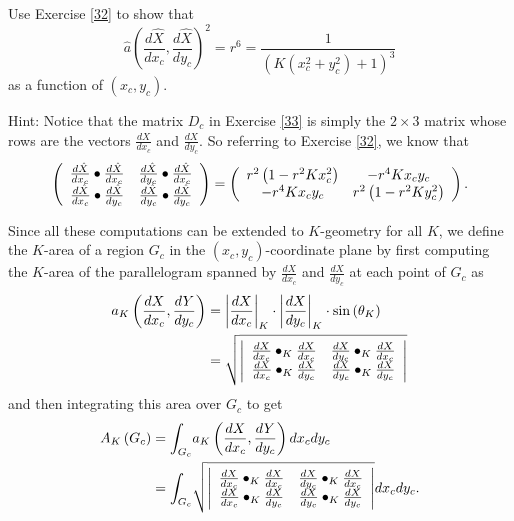 \documentclass{ximera}
\begin{document}
\begin{exercise}
\label{79}Use Exercise \ref{32} to show that%
\[
\hat{a}\left(  \frac{d\hat{X}}{dx_{c}},\frac{d\hat{X}}{dy_{c}}\right)
^{2}=r^{6}=\frac{1}{\left(  K\left(  x_{c}^{2}+y_{c}^{2}\right)  +1\right)
^{3}}%
\]
as a function of $\left(  x_{c},y_{c}\right)  $.

Hint: Notice that the matrix $D_{c}$ in Exercise \ref{33} is simply the
$2\times3$ matrix whose rows are the vectors $\frac{dX}{dx_{c}}$ and $\frac
{dX}{dy_{c}}$. So referring to Exercise \ref{32}, we know that%
\[
\left(
\begin{array}
[c]{cc}%
\frac{d\hat{X}}{dx_{c}}\bullet\frac{d\hat{X}}{dx_{c}} & \frac{d\hat{X}}%
{dy_{c}}\bullet\frac{d\hat{X}}{dx_{c}}\\
\frac{d\hat{X}}{dx_{c}}\bullet\frac{d\hat{X}}{dy_{c}} & \frac{d\hat{X}}%
{dy_{c}}\bullet\frac{d\hat{X}}{dy_{c}}%
\end{array}
\right)  =\left(
\begin{array}
[c]{cc}%
r^{2}\left(  1-r^{2}Kx_{c}^{2}\right)  & -r^{4}Kx_{c}y_{c}\\
-r^{4}Kx_{c}y_{c} & r^{2}\left(  1-r^{2}Ky_{c}^{2}\right)
\end{array}
\right)  .
\]

\end{exercise}

Since all these computations can be extended to $K$-geometry for all $K$, we
define the $K$-area of a region $G_{c}$ in the $\left(  x_{c},y_{c}\right)
$-coordinate plane by first computing the $K$-area of the parallelogram
spanned by $\frac{dX}{dx_{c}}$ and $\frac{dX}{dy_{c}}$ at each point of
$G_{c}$ as%
\begin{align*}
a_{K}\left(  \frac{dX}{dx_{c}},\frac{dY}{dy_{c}}\right)   &  =\left\vert
\frac{dX}{dx_{c}}\right\vert _{K}\cdot\left\vert \frac{dX}{dy_{c}}\right\vert
_{K}\cdot\mathrm{sin}\left(  \theta_{K}\right) \\
&  =\sqrt{\left\vert
\begin{array}
[c]{cc}%
\frac{dX}{dx_{c}}\bullet_{K}\frac{dX}{dx_{c}} & \frac{dX}{dy_{c}}\bullet
_{K}\frac{dX}{dx_{c}}\\
\frac{dX}{dx_{c}}\bullet_{K}\frac{dX}{dy_{c}} & \frac{dX}{dy_{c}}\bullet
_{K}\frac{dX}{dy_{c}}%
\end{array}
\right\vert }%
\end{align*}
and then integrating this area over $G_{c}$ to get%
\begin{align*}
A_{K}\left(  G_{c}\right)   &  =%
{\displaystyle\int\nolimits_{G_{c}}}
a_{K}\left(  \frac{dX}{dx_{c}},\frac{dY}{dy_{c}}\right)  dx_{c}dy_{c}\\
&  =%
{\displaystyle\int\nolimits_{G_{c}}}
\sqrt{\left\vert
\begin{array}
[c]{cc}%
\frac{dX}{dx_{c}}\bullet_{K}\frac{dX}{dx_{c}} & \frac{dX}{dy_{c}}\bullet
_{K}\frac{dX}{dx_{c}}\\
\frac{dX}{dx_{c}}\bullet_{K}\frac{dX}{dy_{c}} & \frac{dX}{dy_{c}}\bullet
_{K}\frac{dX}{dy_{c}}%
\end{array}
\right\vert }dx_{c}dy_{c}.
\end{align*}
\end{document}
